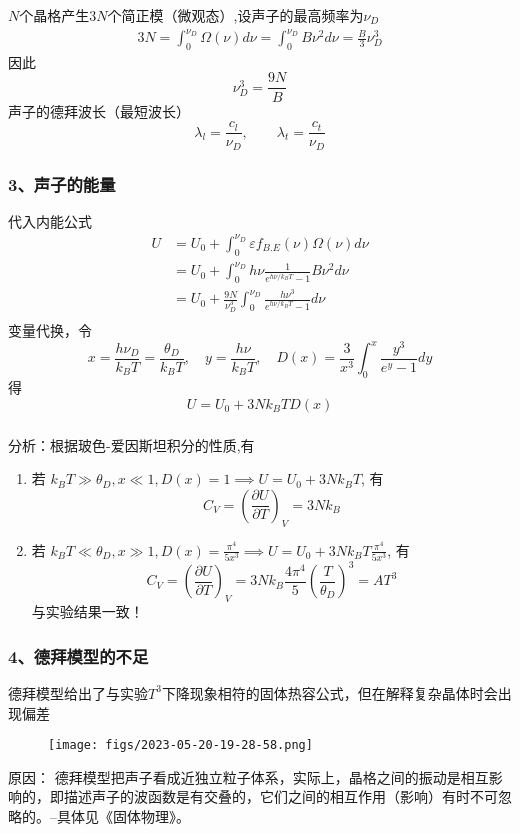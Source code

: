 \begin{frame}[label=current]
  \frametitle{}
$N$个晶格产生$3N$个简正模（微观态）,设声子的最高频率为$\nu _D$
\[ 
\begin{aligned}
  3N= \int_{0}^{\nu _D}\Omega (\nu) d \nu = \int_{0}^{\nu _D} B \nu^2  d \nu = \frac{B}{3} \nu _D^3
\end{aligned}
\]
因此
\[ \nu _D^3 = \frac{9N}{B} \]
声子的德拜波长（最短波长）
\[ \lambda _l = \frac{c_l}{\nu _D}, \qquad \lambda _t = \frac{c_t}{\nu _D}\]
\end{frame} 

\begin{frame}[label=current]
  \frametitle{ 3、声子的能量}
  代入内能公式
   \[ 
   \begin{aligned}
    U &= U_0 + \int_{0}^{\nu _D} \varepsilon f_{B.E}(\nu) \Omega (\nu) d \nu   \\ 
      &= U_0 + \int_{0}^{\nu _D} h \nu  \frac{1}{e^{h \nu /k_B T}-1} B \nu^2  d \nu \\
      &= U_0 + \frac{9N}{\nu _D^3} \int_{0}^{\nu _D} \frac{h\nu^3 }{e^{h \nu /k_B T}-1}  d \nu \\
   \end{aligned} 
   \]
   变量代换，令 
   \[ x= \frac{h\nu _D}{k_B T} = \frac{\theta_D}{k_B T}, \quad y= \frac{h\nu}{k_B T}, \quad D(x) = \frac{3}{x^3} \int_{0}^{x}  \frac{y^3}{e^{y}-1} dy\]
   得 
   \[ U= U_0 + 3Nk_B T D(x)\]
\end{frame} 

\begin{frame}[label=current]
  \frametitle{}
分析：根据玻色-爱因斯坦积分的性质,有 
\begin{enumerate}
  \item 若 $k_B T\gg \theta_D, x \ll 1, D(x)=1 \implies U= U_0 + 3Nk_B T$, 有 \[ C_V = \left(\frac{\partial U}{\partial T }\right)_V = 3N k_B \]
  \item 若 $k_B T\ll \theta_D, x \gg 1, D(x)=\frac{\pi ^4}{5x^3} \implies U= U_0 + 3Nk_B T \frac{\pi ^4}{5x^3}$, 有 \[ C_V = \left(\frac{\partial U}{\partial T }\right)_V = 3N k_B \frac{4\pi ^4}{5} \left(\frac{T}{\theta_D}\right)^3 = A T^3\] 
  与实验结果一致！
\end{enumerate}

\end{frame} 

\begin{frame}[label=current]
  \frametitle{4、德拜模型的不足}
  德拜模型给出了与实验$T^3$下降现象相符的固体热容公式，但在解释复杂晶体时会出现偏差
\begin{figure}[htbp]
  \centering
  \texttt{[image: figs/2023-05-20-19-28-58.png]}
\end{figure}
原因： 德拜模型把声子看成近独立粒子体系，实际上，晶格之间的振动是相互影响的，即描述声子的波函数是有交叠的，它们之间的相互作用（影响）有时不可忽略的。--具体见《固体物理》。
\end{frame} 


